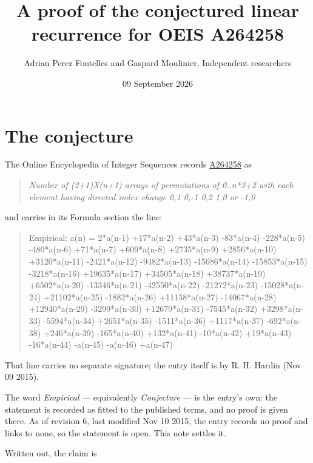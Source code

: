 \documentclass[11pt]{article}
\title{A proof of the conjectured linear recurrence for OEIS A264258}
\author{Adrian Perez Fontelles and Gaspard Moulinier, Independent researchers}
\date{09 September 2026}
\theoremstyle{definition}
\begin{document}
\maketitle
\section{The conjecture}

The Online Encyclopedia of Integer Sequences records \href{https://oeis.org/A264258}{A264258} as

\begin{quote}\itshape Number of (2+1)X(n+1) arrays of permutations of 0..n*3+2 with each element having directed index change 0,1 0,-1 0,2 1,0 or -1,0\end{quote}

and carries in its Formula section the line:

\begin{quote}\ttfamily Empirical: a(n) = 2*a(n-1) +17*a(n-2) +43*a(n-3) -83*a(n-4) -228*a(n-5) -480*a(n-6) +71*a(n-7) +609*a(n-8) +2735*a(n-9) +2856*a(n-10) +3120*a(n-11) -2421*a(n-12) -9482*a(n-13) -15686*a(n-14) -15853*a(n-15) -3218*a(n-16) +19635*a(n-17) +34505*a(n-18) +38737*a(n-19) +6502*a(n-20) -13346*a(n-21) -42550*a(n-22) -21272*a(n-23) -15028*a(n-24) +21102*a(n-25) -1882*a(n-26) +11158*a(n-27) -14067*a(n-28) +12940*a(n-29) -3299*a(n-30) +12679*a(n-31) -7545*a(n-32) +3298*a(n-33) -5594*a(n-34) +2651*a(n-35) -1511*a(n-36) +1117*a(n-37) -692*a(n-38) +246*a(n-39) -165*a(n-40) +132*a(n-41) -10*a(n-42) +19*a(n-43) -16*a(n-44) -a(n-45) -a(n-46) +a(n-47)\end{quote}

That line carries no separate signature; the entry itself is by R. H. Hardin (Nov 09 2015).

The word {\itshape Empirical} --- equivalently {\itshape Conjecture} --- is the entry's own: the statement is recorded as fitted to the published terms, and no proof is given there. As of revision 6, last modified Nov 10 2015, the entry records no proof and links to none, so the statement is open. This note settles it.

Written out, the claim is
\end{document}
